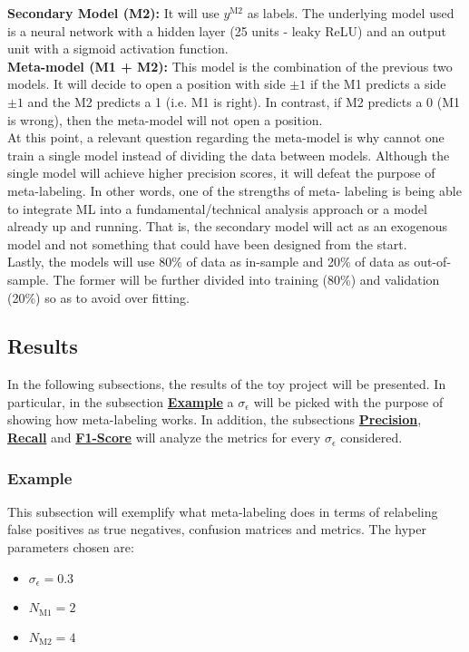 \documentclass[a4paper]{report}
\begin{document}
\vspace{.1cm}
\noindent
\textbf{Secondary Model (M2):} It will use $y^{\text{M2}}$ as labels. 
The underlying model used is a neural network with a hidden layer (25 
units - leaky ReLU) and an output unit with a sigmoid activation 
function.\\

\vspace{.1cm}
\noindent
\textbf{Meta-model (M1 + M2):} This model is the combination of the 
previous two models. It will decide to open a position with side 
$\pm 1$ if the M1 predicts a side $\pm 1$ and the M2 predicts a 1 
(i.e. M1 is right). In contrast, if M2 predicts a 0 (M1 is wrong), 
then the meta-model will not open a position.\\

At this point, a relevant question regarding the meta-model is why cannot one 
train a single model instead of dividing the data between models. Although 
the single model will achieve higher precision scores, it will defeat the 
purpose of meta-labeling. In other words, one of the strengths of meta-
labeling is being able to integrate ML into a fundamental/technical analysis 
approach or a model already up and running. That is, the secondary model will 
act as an exogenous model and not something that could have been designed 
from the start.\\

Lastly, the models will use 80\% of data as in-sample and 20\% of data as 
out-of-sample. The former will be further divided into training (80\%) and 
validation (20\%) so as to avoid over fitting.

\subsection{Results}
In the following subsections, the results of the toy project will be 
presented. In particular, in the subsection 
\textbf{\hyperref[sec:metaLabelingToyExpl]{Example}} a $\sigma_\epsilon$ will 
be picked with the purpose of showing how meta-labeling works. In addition, 
the subsections \textbf{\hyperref[sec:toyProjectPrecision]{Precision}}, 
\textbf{\hyperref[sec:toyProjectRecall]{Recall}} and
\textbf{\hyperref[sec:toyProjectF1Score]{F1-Score}} will analyze the metrics 
for every $\sigma_\epsilon$ considered.

\subsubsection{Example}
\label{sec:metaLabelingToyExpl}
This subsection will exemplify what meta-labeling does in terms of 
relabeling false positives as true negatives, confusion matrices and 
metrics. The hyper parameters chosen are:
\begin{itemize}
	\item $\sigma_\epsilon = 0.3$
	\item $N_{\text{M1}} = 2$
	\item $N_{\text{M2}} = 4$
\end{itemize}
\end{document}
